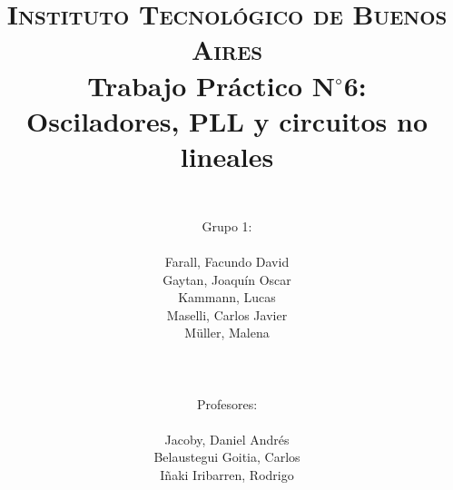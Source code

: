 




	\title{
		\normalfont \normalsize \textsc{Instituto Tecnol\'ogico de Buenos Aires} \\ [25pt]
		\huge Trabajo Pr\'actico N$^{\circ}$6:\\Osciladores, PLL y circuitos no lineales \\
		\author{
			\\Grupo 1:\\\\Farall, Facundo David\\Gaytan, Joaqu\'in Oscar\\Kammann, Lucas\\Maselli, Carlos Javier\\M\"uller, Malena \\ \\ \\ \\
			Profesores: \\\\ Jacoby, Daniel Andrés\\Belaustegui Goitia, Carlos\\Iñaki Iribarren, Rodrigo \\ \\ \\ 
		} 		
	}
	\maketitle
	\newpage

	\tableofcontents

	\newpage
	
	\newpage
	
	\newpage
	


